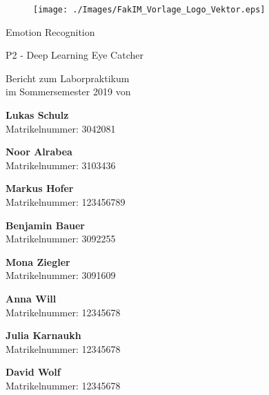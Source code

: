 \documentclass[12pt,a4paper,headinclude,twoside, plainheadsepline, open=right,numbers=noenddot]{scrreprt}
\begin{document}
\pagestyle{empty}

\clearscrheadings\clearscrplain

\begin{titlepage}
\begin{figure}[thb]
       \texttt{[image: ./Images/FakIM\_Vorlage\_Logo\_Vektor.eps]}
\end{figure}
\begin{center}
\rule{0pt}{0pt}
\vfill

\begin{huge}
Emotion Recognition\\[0.75ex]
\end{huge}
\begin{large}
P2 - Deep Learning Eye Catcher
\end{large}


\vfill
\vfill

Bericht zum Laborpraktikum\\
im Sommersemester 2019 von\\
\vfill
\setlength{\columnsep}{.0cm}
\begin{multicols}{1}

\textbf{Lukas Schulz}\\
Matrikelnummer: 3042081

\textbf{Noor Alrabea}\\
Matrikelnummer: 3103436
\end{multicols}

\begin{multicols}{2}
\textbf{Markus Hofer}\\
Matrikelnummer: 123456789

\textbf{Benjamin Bauer}\\
Matrikelnummer: 3092255
\end{multicols}

\begin{multicols}{2}
\textbf{Mona Ziegler}\\
Matrikelnummer: 3091609

\textbf{Anna Will}\\
Matrikelnummer: 12345678
\end{multicols}

\begin{multicols}{2}
\textbf{Julia Karnaukh}\\
Matrikelnummer: 12345678

\textbf{David Wolf}\\
Matrikelnummer: 12345678
\end{multicols}


\end{center}
\end{titlepage}
\end{document}
